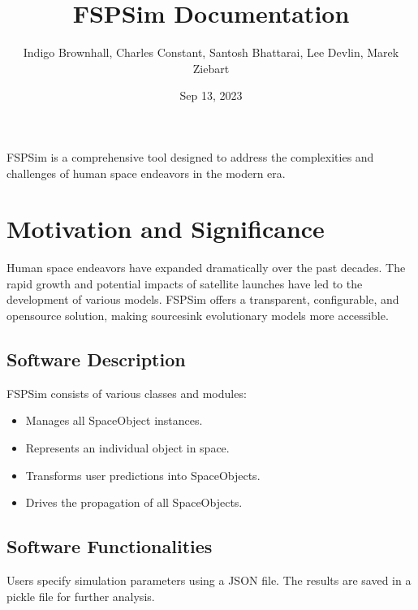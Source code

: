 \documentclass[letterpaper,10pt,english]{sphinxmanual}
\title{FSPSim Documentation}
\date{Sep 13, 2023}
\author{Indigo Brownhall, 
Charles Constant, 
Santosh Bhattarai, 
Lee Devlin, 
Marek Ziebart}
\begin{document}
\pagestyle{empty}
\sphinxmaketitle
\pagestyle{plain}
\sphinxtableofcontents
\pagestyle{normal}
\label{\detokenize{index::doc}}


\sphinxAtStartPar
FSPSim is a comprehensive tool designed to address the complexities and challenges of human space endeavors in the modern era.


\chapter{Motivation and Significance}
\label{\detokenize{index:motivation-and-significance}}
\sphinxAtStartPar
Human space endeavors have expanded dramatically over the past decades. The rapid growth and potential impacts of satellite launches have led to the development of various models. FSPSim offers a transparent, configurable, and open\sphinxhyphen{}source solution, making source\sphinxhyphen{}sink evolutionary models more accessible.

\begin{figure}[htbp]
\centering

\noindent{}
\end{figure}


\section{Software Description}
\label{\detokenize{index:software-description}}
\sphinxAtStartPar
FSPSim consists of various classes and modules:
\begin{itemize}
\item {} 
\sphinxAtStartPar
{} Manages all SpaceObject instances.

\item {} 
\sphinxAtStartPar
{} Represents an individual object in space.

\item {} 
\sphinxAtStartPar
{} Transforms user predictions into SpaceObjects.

\item {} 
\sphinxAtStartPar
{} Drives the propagation of all SpaceObjects.

\end{itemize}


\section{Software Functionalities}
\label{\detokenize{index:software-functionalities}}
\sphinxAtStartPar
Users specify simulation parameters using a JSON file. The results are saved in a pickle file for further analysis.
\end{document}
